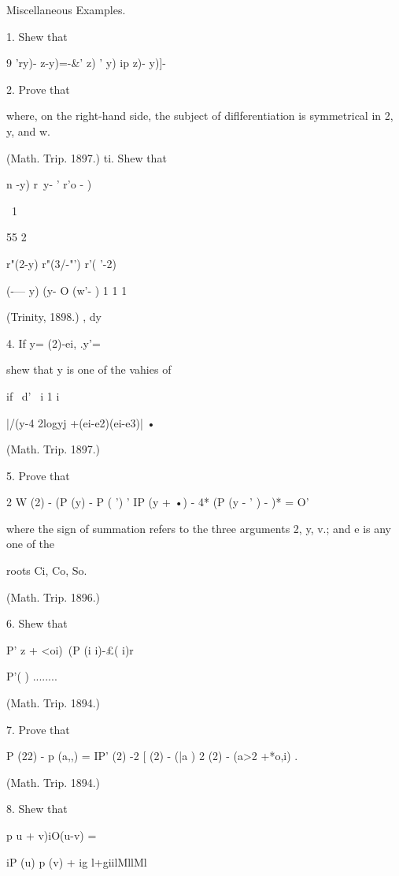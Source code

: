 {Miscellaneous Examples. 

1. Shew that 

9  'ry)-  z-y)=-\&' z) ' y) ip z)-  y)]-\ 

2. Prove that 

where, on the right-hand side, the subject of diflferentiation is symmetrical in 2, y, and w. 

(Math. Trip. 1897.) 
ti. Shew that 



n -y) r\ y- '  r'o - ) 



\  1 



55 2 



r"(2-y) r"(3/-"') r'( '-2) 

  (-— y)   (y- O   (w'- ) 
1 1 1 

(Trinity, 1898.) 
, dy 



4. If y= (2)-ei, .y'=  

shew that y is one of the vahies of 

if \ d'  \ i 1 i 

|/(y-4 2logyj +(ei-e2)(ei-e3)| • 

(Math. Trip. 1897.) 

5. Prove that 

2 W (2) -    (P (y) - P ( ') ' IP (y + •) - 4* (P (y - ' ) -  )* = O' 

where the sign of summation refers to the three arguments 2, y, v.; and e is any one of the 

roots Ci, Co, So. 

(Math. Trip. 1896.) 

6. Shew that 

P' z + <oi)\  (P (i i)-£( i)r 






P'( ) ........ 

(Math. Trip. 1894.) 

7. Prove that 

P (22) - p (a,,) = IP' (2) -2 [  (2) -   (|a ) 2    (2) -   (a>2 +*o,i)  . 

(Math. Trip. 1894.) 

8. Shew that 



p u + v)iO(u-v) = 



iP (u) p (v) + ig l+giilMllMl 



}
